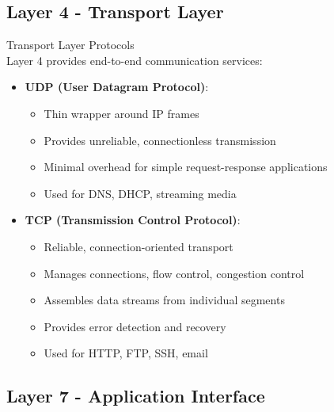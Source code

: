 \subsection{Layer 4 - Transport Layer}

\begin{definition}{Transport Layer Protocols}\\
    Layer 4 provides end-to-end communication services:
    \begin{itemize}
        \item \textbf{UDP (User Datagram Protocol)}:
            \begin{itemize}
                \item Thin wrapper around IP frames
                \item Provides unreliable, connectionless transmission
                \item Minimal overhead for simple request-response applications
                \item Used for DNS, DHCP, streaming media
            \end{itemize}
        \item \textbf{TCP (Transmission Control Protocol)}:
            \begin{itemize}
                \item Reliable, connection-oriented transport
                \item Manages connections, flow control, congestion control
                \item Assembles data streams from individual segments
                \item Provides error detection and recovery
                \item Used for HTTP, FTP, SSH, email
            \end{itemize}
    \end{itemize}
\end{definition}

\subsection{Layer 7 - Application Interface}

